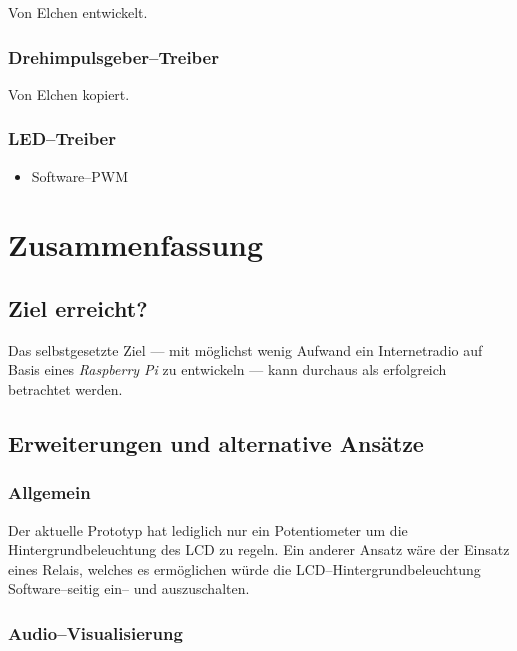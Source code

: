 \documentclass[11pt,ngerman,toc=listof,index=totoc]{scrreprt}
\providecommand{\tightlist}{%
  \setlength{\itemsep}{0pt}\setlength{\parskip}{0pt}}
\begin{document}
Von Elchen entwickelt.

\subsection{Drehimpulsgeber--Treiber}\label{drehimpulsgebertreiber}

Von Elchen kopiert.

\subsection{LED--Treiber}\label{ledtreiber}

\begin{itemize}
\tightlist
\item
  Software--PWM
\end{itemize}

\chapter{Zusammenfassung}\label{zusammenfassung}

\section{Ziel erreicht?}\label{ziel-erreicht}

Das selbstgesetzte Ziel --- mit möglichst wenig Aufwand ein
Internetradio auf Basis eines \emph{Raspberry Pi} zu entwickeln --- kann
durchaus als erfolgreich betrachtet werden.

\section{Erweiterungen und alternative
Ansätze}\label{erweiterungen-und-alternative-ansuxe4tze}

\subsection{Allgemein}\label{allgemein}

Der aktuelle Prototyp hat lediglich nur ein Potentiometer um die
Hintergrundbeleuchtung des LCD zu regeln. Ein anderer Ansatz wäre der
Einsatz eines Relais, welches es ermöglichen würde die
LCD--Hintergrundbeleuchtung Software--seitig ein-- und auszuschalten.

\subsection{Audio--Visualisierung}\label{audiovisualisierung}
\end{document}
